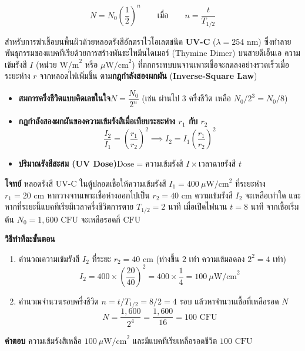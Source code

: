 \begin{equation}
    N = N_0 \left(\frac{1}{2}\right)^n \qquad \text{เมื่อ} \qquad n = \frac{t}{T_{1/2}}
    \label{eq:lab11_halflife}
\end{equation}

สำหรับการฆ่าเชื้อบนพื้นผิวด้วยหลอดรังสีอัลตราไวโอเลตชนิด \textbf{UV-C} ($\lambda = 254\text{ nm}$) ซึ่งทำลายพันธุกรรมของแบคทีเรียด้วยการสร้างพันธะไทมีนไดเมอร์ (Thymine Dimer) บนสายดีเอ็นเอ ความเข้มรังสี $I$ (หน่วย $\text{W/m}^2$ หรือ $\mu\text{W/cm}^2$) ที่ตกกระทบบนจานเพาะเชื้อจะลดลงอย่างรวดเร็วเมื่อระยะห่าง $r$ จากหลอดไฟเพิ่มขึ้น ตาม\textbf{กฎกำลังสองผกผัน} (\textbf{Inverse-Square Law})

\begin{conceptbox}
\begin{itemize}
    \item \textbf{สมการครึ่งชีวิตแบบคิดเลขในใจ}\quad $N = \dfrac{N_0}{2^n}$ (เช่น ผ่านไป $3$ ครึ่งชีวิต เหลือ $N_0 / 2^3 = N_0 / 8$)
    \item \textbf{กฎกำลังสองผกผันของความเข้มรังสีเมื่อเทียบระยะห่าง $r_1$ กับ $r_2$}
    \begin{equation*}
        \frac{I_2}{I_1} = \left(\frac{r_1}{r_2}\right)^2 \implies I_2 = I_1 \left(\frac{r_1}{r_2}\right)^2
    \end{equation*}
    \item \textbf{ปริมาณรังสีสะสม (UV Dose)}\quad $\text{Dose} = \text{ความเข้มรังสี } I \times \text{เวลาฉายรังสี } t$
\end{itemize}
\end{conceptbox}

\begin{worked}
\textbf{โจทย์} หลอดรังสี UV-C ในตู้ปลอดเชื้อให้ความเข้มรังสี $I_1 = 400\ \mu\text{W/cm}^2$ ที่ระยะห่าง $r_1 = 20\text{ cm}$ หากวางจานเพาะเชื้อห่างออกไปเป็น $r_2 = 40\text{ cm}$ ความเข้มรังสี $I_2$ จะเหลือเท่าใด และหากที่ระยะนี้แบคทีเรียมีเวลาครึ่งชีวิตการตาย $T_{1/2} = 2\text{ นาที}$ เมื่อเปิดไฟนาน $t = 8\text{ นาที}$ จากเชื้อเริ่มต้น $N_0 = 1{,}600\text{ CFU}$ จะเหลือรอดกี่ $\text{CFU}$

\textbf{วิธีทำทีละขั้นตอน}
\begin{enumerate}
    \item คำนวณความเข้มรังสี $I_2$ ที่ระยะ $r_2 = 40\text{ cm}$ (ห่างขึ้น $2$ เท่า ความเข้มลดลง $2^2 = 4$ เท่า)
    \begin{equation*}
        I_2 = 400 \times \left(\frac{20}{40}\right)^2 = 400 \times \frac{1}{4} = 100\ \mu\text{W/cm}^2
    \end{equation*}
    \item คำนวณจำนวนรอบครึ่งชีวิต $n = t / T_{1/2} = 8 / 2 = 4\text{ รอบ}$ แล้วหาจำนวนเชื้อที่เหลือรอด $N$
    \begin{equation*}
        N = \frac{1{,}600}{2^4} = \frac{1{,}600}{16} = 100\text{ CFU}
    \end{equation*}
\end{enumerate}
\textbf{คำตอบ} ความเข้มรังสีเหลือ $100\ \mu\text{W/cm}^2$ และมีแบคทีเรียเหลือรอดชีวิต $100\text{ CFU}$
\end{worked}

